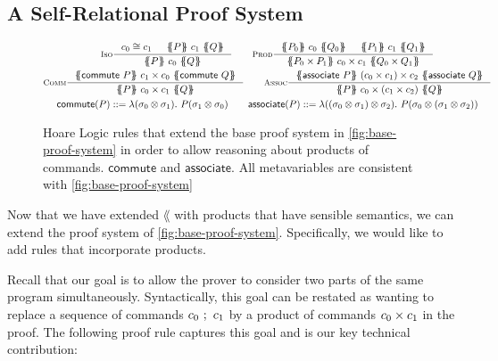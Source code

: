 \documentclass[p.tex]{subfiles}
\begin{document}
\subsection{A Self-Relational Proof System}
\begin{figure}
\begin{spreadlines}{5pt}
\begin{gather*}
  \inference[\textsc{Iso}]{%
    c_0 \cong c_1&
    \hoare{P}{c_1}{Q}
  }{%
    \hoare{P}{c_0}{Q}
  }
  \qquad
  \inference[\textsc{Prod}]{%
    \hoare{P_0}{c_0}{Q_0}&
    \hoare{P_1}{c_1}{Q_1}
  }{%
    \hoare{P_0 \times P_1}{c_0 \times c_1}{Q_0 \times Q_1}
  }
  \\
  \inference[\textsc{Comm}]{%
    \hoare{\commute~P}{c_1 \times c_0}{\commute~Q}
  }{%
    \hoare{P}{c_0 \times c_1}{Q}
  }
  \qquad
  \inference[\textsc{Assoc}]{%
    \hoare{\associate~P}{(c_0 \times c_1) \times c_2}{\associate~Q}
  }{%
    \hoare{P}{c_0 \times (c_1 \times c_2)}{Q}
  }
  \\
  \commute(P) ::= \lambda(\sigma_0 \otimes \sigma_1).~P(\sigma_1 \otimes \sigma_0)
  \qquad
  \associate(P) ::=%
  \lambda((\sigma_0 \otimes \sigma_1) \otimes \sigma_2).~P(\sigma_0
  \otimes (\sigma_1 \otimes \sigma_2))
\end{gather*}
\end{spreadlines}
\caption{%
  Hoare Logic rules that extend the base proof system in
  \cref{fig:base-proof-system} in order to allow reasoning about
  products of commands.
  $\textsf{commute}$ and $\textsf{associate}$.
  All metavariables are consistent with \cref{fig:base-proof-system}
}\label{fig:proof-rules}
\end{figure}

Now that we have extended $\lang$ with products that have sensible
semantics, we can extend the proof system of
\cref{fig:base-proof-system}.
Specifically, we would like to add rules that incorporate products.

Recall that our goal is to allow the prover to consider two parts of
the same program simultaneously. Syntactically, this goal can be
restated as wanting to replace a sequence of commands $c_0~;~c_1$
by a product of commands $c_0\times c_1$ in the proof.
The following proof rule captures this goal and is our key technical
contribution:
\end{document}
